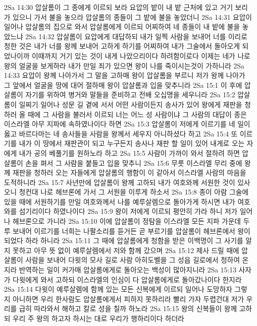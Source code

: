 2Sa 14:30  압살롬이 그 종에게 이르되 보라 요압의 밭이 내 밭 근처에 있고 거기 보리가 있으니 가서 불을 놓으라 압살롬의 종들이 그 밭에 불을 놓았더니
2Sa 14:31  요압이 일어나 압살롬의 집으로 와서 압살롬에게 이르되 어찌하여 네 종들이 내 밭에 불을 놓았느냐
2Sa 14:32  압살롬이 요압에게 대답하되 내가 일찍 사람을 보내어 너를 이리로 청한 것은 내가 너를 왕께 보내어 고하게 하기를 어찌하여 내가 그술에서 돌아오게 되었나이까 이때까지 거기 있는 것이 내게 나았으리이다 하려함이로다 이제는 네가 나로 왕의 얼굴을 보게하라 내가 만일 죄가 있으면 왕이 나를 죽이시는것이 가하니라
2Sa 14:33  요압이 왕께 나아가서 그 말을 고하매 왕이 압살롬을 부르니 저가 왕께 나아가 그 앞에서 얼굴을 땅에 대어 절하매 왕이 압살롬과 입을 맞추니라
2Sa 15:1  이 후에 압살롬이 자기를 위하여 병거와 말들을 준비하고 전배 오십명을 세우니라
2Sa 15:2  압살롬이 일찌기 일어나 성문 길 곁에 서서 어떤 사람이든지 송사가 있어 왕에게 재판을 청하러 올 때에 그 사람을 불러서 이르되 너는 어느 성 사람이냐 그 사람의 대답이 종은 이스라엘 아무 지파에 속하였나이다 하면
2Sa 15:3  압살롬이 저에게 이르기를 네 일이 옳고 바르다마는 네 송사들을 사람을 왕께서 세우지 아니하셨다 하고
2Sa 15:4  또 이르기를 내가 이 땅에서 재판관이 되고 누구든지 송사나 재판 할 일이 있어 내게로 오는 자에게 내가 공의 베풀기를 원하노라 하고
2Sa 15:5  사람이 가까이 와서 절하려 하면 압살롬이 손을 펴서 그 사람을 붙들고 입을 맞추니
2Sa 15:6  무릇 이스라엘 무리 중에 왕께 재판을 청하러 오는 자들에게 압살롬의 행함이 이 같아서 이스라엘 사람의 마음을 도적하니라
2Sa 15:7  사년만에 압살롬이 왕께 고하되 내가 여호와께 서원한 것이 있사오니 청컨대 나로 헤브론에 가서 그 서원을 이루게 하소서
2Sa 15:8  종이 아람 그술에 있을 때에 서원하기를 만일 여호와께서 나를 예루살렘으로 돌아가게 하시면 내가 여호와를 섬기리이다 하였나이다
2Sa 15:9  왕이 저에게 이르되 평안히 가라 하니 저가 일어나 헤브론으로 가니라
2Sa 15:10  이에 압살롬이 정탐을 이스라엘 모든 지파 가운데 두루 보내어 이르기를 너희는 나팔소리를 듣거든 곧 부르기를 압살롬이 헤브론에서 왕이 되었다 하라 하니라
2Sa 15:11  그 때에 압살롬에게 청함을 받은 이백명이 그 사기를 알지 못하고 아무 뜻 없이 예루살렘에서 저와 함께 갔으며
2Sa 15:12  제사 드릴 때에 압살롬이 사람을 보내어 다윗의 모사 길로 사람 아히도벨을 그 성읍 길로에서 청하여 온지라 반역하는 일이 커가매 압살롬에게로 돌아오는 백성이 많아지니라
2Sa 15:13  사자가 다윗에게 와서 고하되 이스라엘의 인심이 다 압살롬에게로 돌아갔나이다 한지라
2Sa 15:14  다윗이 예루살렘에 함께 있는 모든 신복에게 이르되 일어나 도망하자 그렇지 아니하면 우리 한사람도 압살롬에게서 피하지 못하리라 빨리 가자 두렵건대 저가 우리를 급히 따라와서 해하고 칼로 성을 칠까 하노라
2Sa 15:15  왕의 신복들이 왕께 고하되 우리 주 왕의 하고자 하시는 대로 우리가 행하리이다 하더라
